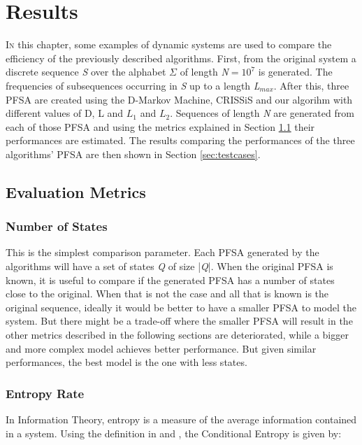 \chapter{Results}\label{cap:4}


{\lettrine[loversize=0.25,findent=0.2em,nindent=0em]{I}{n} this chapter, some examples of dynamic systems are used to compare the efficiency of the previously described algorithms. First, from the original system a discrete sequence \textit{S} over the alphabet $\Sigma$ of length \textit{N}$=10^7$ is generated. The frequencies of subsequences occurring in \textit{S} up to a length \textit{L}$_{max}$. After this, three PFSA are created using the D-Markov Machine, CRISSiS and our algorihm with different values of D, L and $L_1$ and $L_2$. Sequences of length \textit{N} are generated from each of those PFSA and using the metrics explained in Section \ref{sec:metrics} their performances are estimated. The results comparing the performances of the three algorithms' PFSA are then shown in Section \ref{sec:testcases}.

\section{Evaluation Metrics}\label{sec:metrics}

\subsection{Number of States}

This is the simplest comparison parameter. Each PFSA generated by the algorithms will have a set of states \textit{Q} of size |\textit{Q}|. When the original PFSA is known, it is useful to compare if the generated PFSA has a number of states close to the original. When that is not the case and all that is known is the original sequence, ideally it would be better to have a smaller PFSA to model the system. But there might be a trade-off where the smaller PFSA will result in the other metrics described in the following sections are deteriorated, while a bigger and more complex model achieves better performance. But given similar performances, the best model is the one with less states.

\subsection{Entropy Rate}

In Information Theory, entropy is a measure of the average information contained in a system. Using the definition in \cite{cover2012elements} and \citep{asok.14}, the Conditional Entropy is given by:

}
